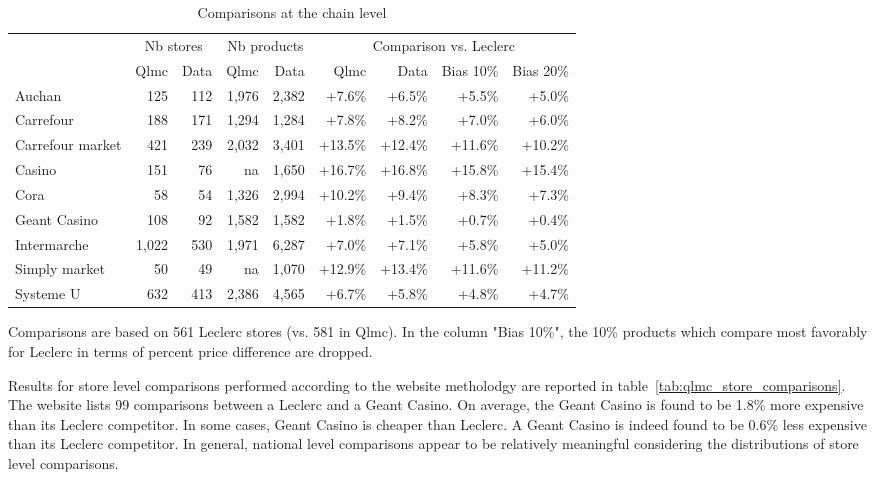 \documentclass[english]{article}
\begin{document}
\begin{table}[H]
\caption{Comparisons at the chain level}
\label{tab:qlmc_chain_comparisons}
\begin{threeparttable}
\renewcommand{\arraystretch}{0.7}%
\small
\begin{tabular}{l|rr|rr|rrrr}
\toprule
\toprule
          & \multicolumn{2}{c|}{Nb stores} &  \multicolumn{2}{c|}{Nb products} & \multicolumn{4}{c}{Comparison vs. Leclerc} \\
           & Qlmc  & Data  & Qlmc  & Data  & Qlmc  & Data  & Bias 10\% & Bias 20\% \\
\midrule
    Auchan & 125   & 112   & 1,976 & 2,382 & +7.6\% & +6.5\% & +5.5\% & +5.0\% \\
    Carrefour & 188   & 171   & 1,294 & 1,284 & +7.8\% & +8.2\% & +7.0\% & +6.0\% \\
    Carrefour market & 421   & 239   & 2,032 & 3,401 & +13.5\% & +12.4\% & +11.6\% & +10.2\% \\
    Casino & 151   & 76    & na    & 1,650 & +16.7\% & +16.8\% & +15.8\% & +15.4\% \\
    Cora  & 58    & 54    & 1,326 & 2,994 & +10.2\% & +9.4\% & +8.3\% & +7.3\% \\
    Geant Casino & 108   & 92    & 1,582 & 1,582 & +1.8\% & +1.5\% & +0.7\% & +0.4\% \\
    Intermarche & 1,022 & 530   & 1,971 & 6,287 & +7.0\% & +7.1\% & +5.8\% & +5.0\% \\
    Simply market & 50    & 49    & na    & 1,070 & +12.9\% & +13.4\% & +11.6\% & +11.2\% \\
    Systeme U & 632   & 413   & 2,386 & 4,565 & +6.7\% & +5.8\% & +4.8\% & +4.7\% \\
\bottomrule
\bottomrule
\end{tabular}
\begin{tablenotes}
      \small
      \item Comparisons are based on 561 Leclerc stores (vs. 581 in Qlmc). In the column "Bias 10\%", the 10\% products which compare most favorably for Leclerc in terms of percent price difference are dropped.
\end{tablenotes}
\end{threeparttable}
\end{table}

Results for store level comparisons performed according to the website metholodgy are reported in table~\ref{tab:qlmc_store_comparisons}. The website lists 99 comparisons between a Leclerc and a Geant Casino. On average, the Geant Casino is found to be 1.8\% more expensive than its Leclerc competitor.  In some cases, Geant Casino is cheaper than Leclerc. A Geant Casino is indeed found to be 0.6\% less expensive than its Leclerc competitor. In general, national level comparisons appear to be relatively meaningful considering the distributions of store level comparisons.
\end{document}
